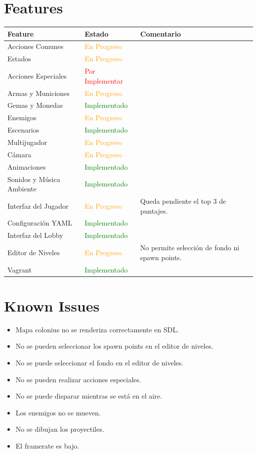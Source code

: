 \documentclass[titlepage,a4paper]{article}
\begin{document}
\section{Features}
\begin{tabular}{ | l | l | l | }
  \hline
  \textbf{Feature} & \textbf{Estado} & \textbf{Comentario} \\ \hline
  Acciones Comunes & \textcolor{orange}{En Progreso} & \\ \hline
  Estados & \textcolor{orange}{En Progreso} & \\ \hline
  Acciones Especiales & \textcolor{red}{Por Implementar} & \\ \hline
  Armas y Municiones & \textcolor{orange}{En Progreso} & \\ \hline
  Gemas y Monedas & \textcolor{green}{Implementado} & \\ \hline
  Enemigos & \textcolor{orange}{En Progreso} & \\ \hline
  Escenarios & \textcolor{green}{Implementado} & \\ \hline
  Multijugador & \textcolor{orange}{En Progreso} & \\ \hline
  Cámara & \textcolor{orange}{En Progreso} & \\ \hline
  Animaciones & \textcolor{green}{Implementado} & \\ \hline
  Sonidos y Música Ambiente & \textcolor{green}{Implementado} & \\ \hline
  Interfaz del Jugador & \textcolor{orange}{En Progreso} & Queda pendiente el top 3 de puntajes. \\ \hline
  Configuración YAML & \textcolor{green}{Implementado} & \\ \hline
  Interfaz del Lobby & \textcolor{green}{Implementado} & \\ \hline
  Editor de Niveles & \textcolor{orange}{En Progreso} & No permite selección de fondo ni spawn points. \\ \hline
  Vagrant & \textcolor{green}{Implementado} & \\ \hline
\end{tabular}

\section{Known Issues}
\begin{itemize}
  \item Mapa colonius no se renderiza correctamente en SDL.
  \item No se pueden seleccionar los spawn points en el editor de niveles.
  \item No se puede seleccionar el fondo en el editor de niveles.
  \item No se pueden realizar acciones especiales.
  \item No se puede disparar mientras se está en el aire.
  \item Los enemigos no se mueven.
  \item No se dibujan los proyectiles.
  \item El framerate es bajo.

\end{itemize}
\end{document}

